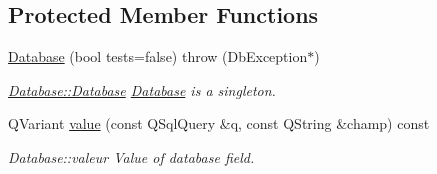 \subsection*{Protected Member Functions}
\begin{DoxyCompactItemize}
\item 
\hypertarget{classDatabases_1_1Database_a2014dda2689bcdf325e8bce020a4b73c}{\hyperlink{classDatabases_1_1Database_a2014dda2689bcdf325e8bce020a4b73c}{Database} (bool tests=false)  throw (\-Db\-Exception$\ast$)}\label{classDatabases_1_1Database_a2014dda2689bcdf325e8bce020a4b73c}

\begin{DoxyCompactList}\small\item\em \hyperlink{classDatabases_1_1Database_a2014dda2689bcdf325e8bce020a4b73c}{Database\-::\-Database} \hyperlink{classDatabases_1_1Database}{Database} is a singleton. \end{DoxyCompactList}\item 
Q\-Variant \hyperlink{classDatabases_1_1Database_abac96d2e284c2f13b7fc692994059d74}{value} (const Q\-Sql\-Query \&q, const Q\-String \&champ) const 
\begin{DoxyCompactList}\small\item\em Database\-::valeur Value of database field. \end{DoxyCompactList}\end{DoxyCompactItemize}
